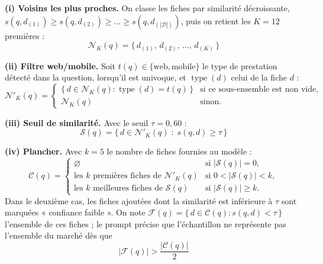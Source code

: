 \textbf{(i) Voisins les plus proches.} On classe les fiches par similarité décroissante,
$s(q, d_{(1)}) \ge s(q, d_{(2)}) \ge \dots \ge s(q, d_{(|\mathcal{D}|)})$, puis on retient les $K = 12$
premières :
\begin{equation}
    \mathcal{N}_{K}(q) = \big\{\, d_{(1)},\, d_{(2)},\, \dots,\, d_{(K)} \,\big\}
    \label{eq:topk}
\end{equation}

\textbf{(ii) Filtre web/mobile.} Soit $t(q) \in \{\text{web}, \text{mobile}\}$ le type de prestation détecté
dans la question, lorsqu'il est univoque, et $\operatorname{type}(d)$ celui de la fiche $d$ :
\begin{equation}
    \mathcal{N}'_{K}(q) =
    \begin{cases}
        \{\, d \in \mathcal{N}_{K}(q) : \operatorname{type}(d) = t(q) \,\} & \text{si ce sous-ensemble est non vide,} \\[4pt]
        \mathcal{N}_{K}(q) & \text{sinon.}
    \end{cases}
    \label{eq:filtre}
\end{equation}

\textbf{(iii) Seuil de similarité.} Avec le seuil $\tau = 0{,}60$ :
\begin{equation}
    \mathcal{S}(q) = \big\{\, d \in \mathcal{N}'_{K}(q) \;:\; s(q,d) \ge \tau \,\big\}
    \label{eq:seuil}
\end{equation}

\textbf{(iv) Plancher.} Avec $k = 5$ le nombre de fiches fournies au modèle :
\begin{equation}
    \mathcal{C}(q) =
    \begin{cases}
        \varnothing
        & \text{si } |\mathcal{S}(q)| = 0, \\[4pt]
        \text{les } k \text{ premières fiches de } \mathcal{N}'_{K}(q)
        & \text{si } 0 < |\mathcal{S}(q)| < k, \\[4pt]
        \text{les } k \text{ meilleures fiches de } \mathcal{S}(q)
        & \text{si } |\mathcal{S}(q)| \ge k.
    \end{cases}
    \label{eq:plancher}
\end{equation}
Dans le deuxième cas, les fiches ajoutées dont la similarité est inférieure à $\tau$ sont marquées
« confiance faible ». On note $\mathcal{F}(q) = \{\, d \in \mathcal{C}(q) : s(q,d) < \tau \,\}$ l'ensemble de
ces fiches ; le prompt précise que l'échantillon ne représente pas l'ensemble du marché dès que
\begin{equation}
    |\mathcal{F}(q)| > \frac{|\mathcal{C}(q)|}{2}
    \label{eq:faible}
\end{equation}

